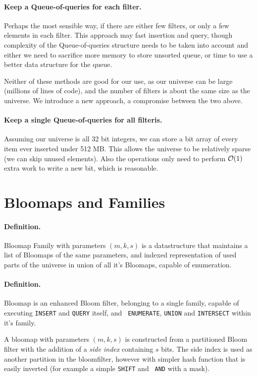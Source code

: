 \paragraph{Keep a Queue-of-queries for each filter.} Perhaps the most sensible
way, if there are either few filters, or only a few elements in each filter.
This approach may fast insertion and query, though complexity of the
Queue-of-queries structure needs to be taken into account and either we need to
sacrifice more memory to store unsorted queue, or time to use a better data
structure for the queue.

Neither of these methods are good for our use, as our universe can be large
(millions of lines of code), and the number of filters is about the same size as
the universe. We introduce a new approach, a compromise between the two above.

\paragraph{Keep a single Queue-of-queries for all filteris.}

Assuming our universe is all 32 bit integers, we can store a bit array of every
item ever inserted under 512 MB. This allows the universe to be relatively
sparse (we can skip unused elements). Also the operations only need to perform
$\mathcal{O}(1)$ extra work to write a new bit, which is reasonable.

\section{Bloomaps and Families}

\paragraph{Definition.} Bloomap Family with parameters $(m, k, s)$ is a
datastructure that maintains a list of Bloomaps of the same parameters, and
indexed representation of used parts of the universe in union of all it's
Bloomaps, capable of enumeration.

\paragraph{Definition.} Bloomap is an enhanced Bloom filter, belonging to a single
family, capable of executing {\tt INSERT} and {\tt QUERY} itself, and {\tt
ENUMERATE}, {\tt UNION} and {\tt INTERSECT} within it's family.

A bloomap with parameters $(m, k, s)$ is constructed from a partitioned Bloom
filter with the addition of a {\it side index} containing $s$ bits. The side
index is used as another partition in the bloomfilter, however with simpler hash
function that is easily inverted (for example a simple {\tt SHIFT} and {\tt
AND} with a mask).

